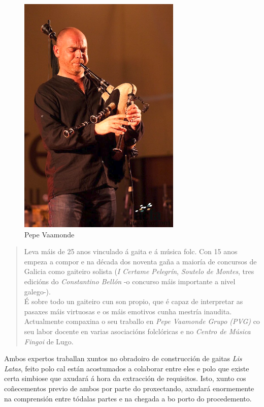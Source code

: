   \begin{figure}[htbp]
   \centering
   \includegraphics[scale=0.8,keepaspectratio=true]{./imagenes/pepe-vaamonde.png}
   \caption{Pepe Vaamonde}
   \label{figura:PepeVaamonde}
  \end{figure}

  \begin{quotation}
  \slshape

   Leva máis de 25 anos vinculado á gaita e á música folc. Con 15 anos empeza a
   compor e na década dos noventa gaña a maioría de concursos de Galicia como
   gaiteiro solista (\textit{I Certame Pelegrín}, \textit{Soutelo de Montes},
   tres edicións do \textit{Constantino Bellón} -o concurso máis importante a
   nivel galego-). \\

   É sobre todo un gaiteiro cun son propio, que é capaz de interpretar as
   pasaxes máis virtuosas e os máis emotivos cunha mestría inaudita. \\

   Actualmente compaxina o seu traballo en \textit{Pepe Vaamonde Grupo (PVG)}
   \cite{PVG} co seu labor docente en varias asociacións folclóricas e no
   \textit{Centro de Música Fingoi} de Lugo. \\
  \end{quotation}

  Ambos expertos traballan xuntos no obradoiro de construcción de gaitas
  \textit{Lis Latas}, feito polo cal están acostumados a colaborar entre eles e
  polo que existe certa simbiose que axudará á hora da extracción de
  requisitos. Isto, xunto cos coñecementos previo de ambos por parte do
  proxectando, axudará enormemente na comprensión entre tódalas partes e na
  chegada a bo porto do procedemento. \\

